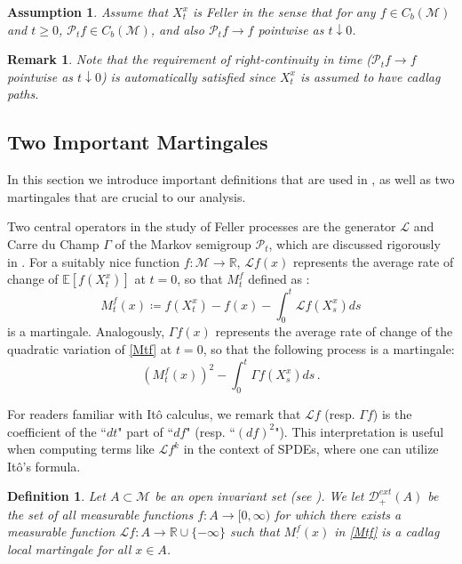 \documentclass[final]{amsart}
\newtheorem{ass}{Assumption}[]
\newtheorem{deff}[thm]{Definition}
\newtheorem{rem}[thm]{Remark}
\numberwithin{thm}{section}
\numberwithin{equation}{section}
\newcommand{\E}{\mathbb{E}}
\newcommand{\mcM}{\mathcal{M}}
\newcommand{\Pp}{\mathcal{P}}
\newcommand{\R}{\mathbb{R}}
\newcommand{\Dme}{\mathcal{D}^{ext}}
\newcommand{\Ll}{\mathcal{L}}
\begin{document}
\begin{ass} \label{as2}
    Assume that $X_t^x$ is Feller in the sense that for any $f \in C_b(\mcM)$ and $t \geq 0$, $\Pp_tf \in C_b(\mcM)$, and also $\Pp_tf \to f$ pointwise as $t \downarrow 0$.
\end{ass}

\begin{rem}
Note that the requirement of right-continuity in time ($\Pp_tf \to f$ pointwise as $t \downarrow 0$) is automatically satisfied since $X^x_t$ is assumed to have cadlag paths.
\end{rem}


 \subsection{Two Important Martingales} \label{generator-stuff}
In this section we introduce important definitions that are used in , as well as two martingales that are crucial to our  analysis.


Two central operators in the study of Feller processes are the generator $\mathcal{L}$ and Carre du Champ $\Gamma$ of the Markov semigroup $\Pp_t$, which are discussed rigorously in \cite{extinction}. For a suitably nice function $f: \mcM \to \R$,  $\mathcal{L}f(x)$ represents the average rate of change of $\E[f(X_t^x)]$ at $t = 0$, so that $M_t^f$ defined as :
\begin{equation} \label{Mtf}
     M_t^f(x) \coloneqq f(X_t^x) - f(x) - \int_0^t \mathcal{L}f(X_s^x)ds   
    \end{equation}
is a martingale. Analogously,     
$\Gamma f(x)$ represents the average rate of change of the quadratic variation of \eqref{Mtf} at $t = 0$, so that the following process is a martingale:
    \begin{equation}\label{Mtf-quad-var}
        (M^f_t(x))^2 - \int_0^t \Gamma f(X_s^x)ds \,.
    \end{equation}

For readers familiar with It\^o calculus, we remark that $\mathcal{L}f$ (resp. $\Gamma f$) is the
 coefficient of the ``$dt$" part of ``$df$" (resp. ``$(df)^2$").  This interpretation is useful when computing terms like $\Ll f^k$ in the context of SPDEs, where one can utilize It\^o's formula.


\begin{deff}
\label{D+}
    Let $A \subset \mcM$ be an open invariant set (see ). We let $\Dme_+(A)$ be the set of all measurable functions $f:A \to [0,\infty)$ for which there exists a measurable function $\mathcal{L}f: A \to \R \cup \{-\infty\}$ such that $M^f_{\cdot}(x)$
   in \eqref{Mtf} is a cadlag local martingale for all $x \in A$.
\end{deff}
\end{document}
